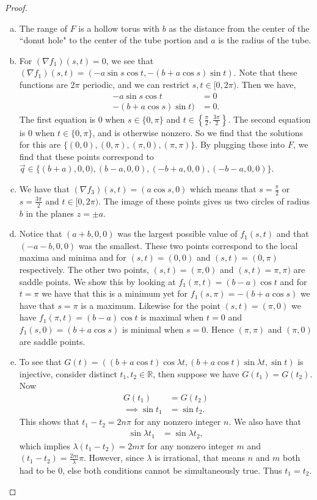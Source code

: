 \documentclass[leqno]{article}
\theoremstyle{nonumberplain}
\newtheorem{proof}{Proof}
\newcommand{\R}{\mathbb{R}}
\begin{document}
\begin{proof}
\begin{enumerate}[(a)]
\item The range of $F$ is a hollow torus with $b$ as the distance from the center of the ``donut hole" to the center of the tube portion and $a$ is the radius of the tube.

\item For $(\nabla f_1)(s,t)=0$, we see that $(\nabla f_1)(s,t)=(-a\sin s \cos t,-(b+a\cos s)\sin t)$. Note that these functions are $2\pi$ periodic, and we can restrict $s,t\in [0,2\pi)$. Then we have,
\begin{align*}
-a\sin s \cos t &=0\\
-(b+a \cos s)\sin t)&=0.
\end{align*}
The first equation is 0 when $s\in \{0,\pi\}$ and $t\in \left\{\frac{\pi}{2},\frac{3\pi}{2}\right\}$. The second equation is $0$ when $t\in \{0,\pi\}$, and is otherwise nonzero.  So we find that the solutions for this are $\{(0,0),(0,\pi),(\pi,0),(\pi,\pi)\}$. By plugging these into $F$, we find that these points correspond to $\vec{q}\in \{(b+a),0,0),(b-a,0,0),(-b+a,0,0),(-b-a,0,0)\}$.

\item We have that $(\nabla f_3)(s,t)=(a\cos s,0)$ which means that $s=\frac{\pi}{2}$ or $s=\frac{3\pi}{2}$ and $t\in [0,2\pi)$. The image of these points gives us two circles of radius $b$ in the planes $z=\pm a$.

\item Notice that $(a+b,0,0)$ was the largest possible value of $f_1(s,t)$ and that $(-a-b,0,0)$ was the smallest. These two points correspond to the local maxima and minima and for $(s,t)=(0,0)$ and $(s,t)=(0,\pi)$ respectively.  The other two points, $(s,t)=(\pi,0)$ and $(s,t)=\pi,\pi)$ are saddle points.  We show this by looking at $f_1(\pi,t)=(b-a)\cos t$ and for $t=\pi$ we have that this is a minimum yet for $f_1(s,\pi)=-(b+a\cos s)$ we have that $s=\pi$ is a maximum.  Likewise for the point $(s,t)=(\pi,0)$ we have $f_1(\pi,t)=(b-a)\cos t$ is maximal when $t=0$ and $f_1(s,0)=(b+a\cos s)$ is minimal when $s=0$. Hence $(\pi,\pi)$ and $(\pi,0)$ are saddle points.

\item To see that $G(t)=((b+a\cos t)\cos \lambda t,(b+a\cos t) \sin \lambda t,\sin t)$ is injective, consider distinct $t_1,t_2\in \R$, then suppose we have $G(t_1)=G(t_2)$. Now
\begin{align*}
G(t_1)&=G(t_2)\\
\implies \sin t_1 &= \sin t_2.
\end{align*}
This shows that $t_1-t_2=2n\pi$ for any nonzero integer $n$. We also have that
\begin{align*}
\sin \lambda t_1 &= \sin \lambda t_2,
\end{align*}
which implies $\lambda (t_1-t_2)=2m \pi$ for any nonzero integer $m$ and $(t_1-t_2)=\frac{2m}{\lambda} \pi$. However, since $\lambda$ is irrational, that means $n$ and $m$ both had to be $0$, else both conditions cannot be simultaneously true. Thus $t_1=t_2$.


\end{enumerate}
\end{proof}
\end{document}
